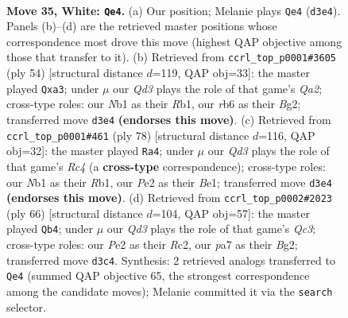 \documentclass[11pt]{article}
\begin{document}
\clearpage

\begin{figure}[p]\centering
\begin{subfigure}{0.46\textwidth}\centering
\resizebox{\linewidth}{!}{%
\newchessgame
\chessboard[
  setfen={q1b3k1/p2n1r1p/1r3b2/2p2P2/Pp1p4/1P1Q2N1/R3P3/1NBK1R2 w - - 1 35},
  showmover=false,
  pgfstyle=straightmove, color=movearrow, markmove={d3-e4}
]}
\caption{}
\end{subfigure}\hfill
\begin{subfigure}{0.46\textwidth}\centering
\resizebox{\linewidth}{!}{%
\newchessgame
\chessboard[
  setfen={r4rk1/2qp3p/n1bNpppP/8/2P1P3/p2R2P1/Q4PB1/1R4K1 w - - 1 28},
  showmover=false,
  pgfstyle=straightmove, color=movearrow, markmove={a2-a3}
]}
\caption{}
\end{subfigure}
\\[4pt]
\begin{subfigure}{0.46\textwidth}\centering
\resizebox{\linewidth}{!}{%
\newchessgame
\chessboard[
  setfen={2r2bk1/p4pp1/q1n1p2p/2pr4/2R5/PP2PN1P/2Q2PP1/1R2B1K1 w - - 33 40},
  showmover=false,
  pgfstyle=straightmove, color=movearrow, markmove={c4-a4}
]}
\caption{}
\end{subfigure}\hfill
\begin{subfigure}{0.46\textwidth}\centering
\resizebox{\linewidth}{!}{%
\newchessgame
\chessboard[
  setfen={4r1k1/1b1r1p2/1q4p1/1Pnp3p/p1pN3P/P1Q1P1P1/2R2PB1/3R2K1 w - - 9 34},
  showmover=false,
  pgfstyle=straightmove, color=movearrow, markmove={c3-b4}
]}
\caption{}
\end{subfigure}
\caption{\textbf{Move 35, White: \texttt{Qe4}.} (a) Our position; Melanie plays \texttt{Qe4} (\texttt{d3e4}). Panels (b)--(d) are the retrieved master positions whose correspondence most drove this move (highest QAP objective among those that transfer to it). (b) Retrieved from \texttt{ccrl\_top\_p0001\#3605} (ply 54) [structural distance $d$=119, QAP obj=33]: the master played \texttt{Qxa3}; under $\mu$ our \emph{Qd3} plays the role of that game's \emph{Qa2}; cross-type roles: our \emph{N}b1 as their \emph{R}b1, our \emph{r}b6 as their \emph{B}g2; transferred move \texttt{d3e4} \textbf{(endorses this move)}. (c) Retrieved from \texttt{ccrl\_top\_p0001\#461} (ply 78) [structural distance $d$=116, QAP obj=32]: the master played \texttt{Ra4}; under $\mu$ our \emph{Qd3} plays the role of that game's \emph{Rc4} (a \textbf{cross-type} correspondence); cross-type roles: our \emph{N}b1 as their \emph{R}b1, our \emph{P}e2 as their \emph{B}e1; transferred move \texttt{d3e4} \textbf{(endorses this move)}. (d) Retrieved from \texttt{ccrl\_top\_p0002\#2023} (ply 66) [structural distance $d$=104, QAP obj=57]: the master played \texttt{Qb4}; under $\mu$ our \emph{Qd3} plays the role of that game's \emph{Qc3}; cross-type roles: our \emph{P}e2 as their \emph{R}c2, our \emph{p}a7 as their \emph{B}g2; transferred move \texttt{d3c4}. Synthesis: 2 retrieved analogs transferred to \texttt{Qe4} (summed QAP objective 65, the strongest correspondence among the candidate moves); Melanie committed it via the \texttt{search} selector.}
\label{fig:thought-m68}
\end{figure}
\end{document}
